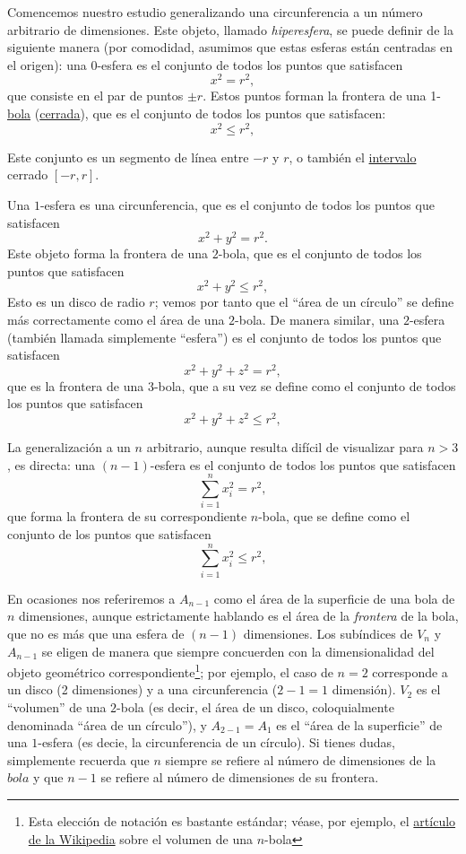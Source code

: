 Comencemos nuestro estudio generalizando una circunferencia a un número arbitrario de dimensiones. Este objeto, llamado \emph{hiperesfera}, se puede definir de la siguiente manera (por comodidad, asumimos que estas esferas están centradas en el origen): una $0$-esfera es el conjunto de todos los puntos que satisfacen
\[
x^2 = r^2,
\]
que consiste en el par de puntos $\pm r$. Estos puntos forman la frontera de una 1-\href{https://es.wikipedia.org/wiki/Bola_(matem%C3%A1tica)}{bola} (\href{https://es.wikipedia.org/wiki/Conjunto_cerrado}{cerrada}), que es el conjunto de todos los puntos que satisfacen:
\[
x^2 \leq r^2,
\]

Este conjunto es un segmento de línea entre $-r$ y $r$, o también el \href{https://es.wikipedia.org/wiki/Intervalo_(matem%C3%A1tica)}{intervalo} cerrado $[-r, r]$. 

Una $1$-esfera es una circunferencia, que es el conjunto de todos los puntos que satisfacen
\[
x^2 + y^2 = r^2.
\]
Este objeto forma la frontera de una $2$-bola, que es el conjunto de todos los puntos que satisfacen
\[
x^2 + y^2 \leq r^2,
\]
Esto es un disco de radio $r$; vemos por tanto que el ``área de un círculo'' se define más correctamente como el área de una $2$-bola. De manera similar, una $2$-esfera (también llamada simplemente ``esfera'') es el conjunto de todos los puntos que satisfacen
\[
x^2 + y^2 + z^2 = r^2,
\]
que es la frontera de una $3$-bola, que a su vez se define como el conjunto de todos los puntos que satisfacen
\[
x^2 + y^2 + z^2 \leq r^2,
\]

La generalización a un $n$ arbitrario, aunque resulta difícil de visualizar para $n > 3$, es directa: una $(n-1)$-esfera es el conjunto de todos los puntos que satisfacen
\[
\sum_{i=1}^{n} x_i^2 = r^2,
\]
que forma la frontera de su correspondiente $n$-bola, que se define como el conjunto de los puntos que satisfacen
\[
\sum_{i=1}^{n} x_i^2 \leq r^2,
\]

En ocasiones nos referiremos a $A_{n-1}$ como el área de la superficie de una bola de $n$ dimensiones, aunque estrictamente hablando es el área de la \emph{frontera} de la bola, que no es más que una esfera de $(n-1)$ dimensiones. Los subíndices de $V_n$ y $A_{n-1}$ se eligen de manera que siempre concuerden con la dimensionalidad del objeto geométrico correspondiente\footnote{Esta elección de notación es bastante estándar; véase, por ejemplo, el \href{https://es.wikipedia.org/wiki/Volumen_de_una_n-bola}{artículo de la Wikipedia} sobre el volumen de una $n$-bola}; por ejemplo, el caso de $n=2$ corresponde a un disco (2 dimensiones) y a una circunferencia ($2-1 = 1$ dimensión). $V_2$ es el ``volumen'' de una $2$-bola (es decir, el área de un disco, coloquialmente denominada ``área de un círculo''), y $A_{2-1} = A_1$ es el ``área de la superficie'' de una $1$-esfera (es decie, la circunferencia de un círculo). Si tienes dudas, simplemente recuerda que $n$ siempre se refiere al número de dimensiones de la $bola$ y que $n-1$ se refiere al número de dimensiones de su frontera. 

